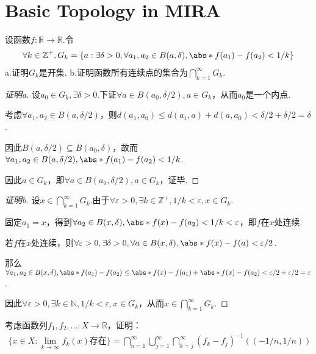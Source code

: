 \section{Basic Topology in MIRA}

\begin{problem}[2.B.12]\label{1.C.1}
    设函数\(f: \mathbb{R} \to \mathbb{R}\).令
    \begin{align*}
        \forall k \in \mathbb{Z}^+, G_k=\{a: \exists \delta>0, \forall a_1,a_2 \in B(a,\delta), \abs*{f(a_1)-f(a_2)}<1/k\}
    \end{align*}
    a.证明\(G_k\)是开集. \quad b.证明函数所有连续点的集合为\(\bigcap_{k=1}^\infty G_k\).
\end{problem}

\begin{proof}[证明a]
    设\(a_0 \in G_k, \exists \delta>0\).下证\(\forall a \in B(a_0,\delta/2), a \in G_k\)，从而\(a_0\)是一个内点.

    考虑\(\forall a_1,a_2 \in B(a,\delta/2)\)，则\(d(a_1,a_0) \leq d(a_1,a)+d(a,a_0)<\delta/2+\delta/2=\delta\).

    因此\(B(a,\delta/2) \subseteq B(a_0,\delta)\)，故而\(\forall a_1,a_2 \in B(a,\delta/2), \abs*{f(a_1)-f(a_2)}<1/k\).

    因此\(a \in G_k\)，即\(\forall a \in B(a_0,\delta/2), a \in G_k\)，证毕.
\end{proof}

\begin{proof}[证明b]
    设\(x \in \bigcap_{k=1}^\infty G_k\).由于\(\forall \varepsilon>0, \exists k \in \mathbb{Z}^+, 1/k<\varepsilon, x \in G_k\).

    固定\(a_1=x\)，得到\(\forall a_2 \in B(x,\delta), \abs*{f(x)-f(a_2)}<1/k<\varepsilon\)，即\(f\)在\(x\)处连续.

    若\(f\)在\(x\)处连续，则\(\forall \varepsilon>0, \exists \delta>0, \forall a \in B(x,\delta), \abs*{f(x)-f(a)}<\varepsilon/2\).

    那么\(\forall a_1, a_2 \in B(x,\delta), \abs*{f(a_1)-f(a_2)} \leq \abs*{f(x)-f(a_1)}+\abs*{f(x)-f(a_2)}<\varepsilon/2+\varepsilon/2=\varepsilon\).

    因此\(\forall \varepsilon>0, \exists k \in \mathbb{N}, 1/k<\varepsilon, x \in G_k\)，从而\(x \in \bigcap_{k=1}^\infty G_k\).
\end{proof}

\begin{problem}[2.B.14]\label{1.C.2}
    考虑函数列\(f_1, f_2, \dots: X \to \mathbb{R}\)，证明：
    \begin{align*}
        \{x \in X: \lim_{k \to \infty} f_k(x)\text{存在}\}
        =\bigcap_{n=1}^\infty \bigcup_{j=1}^\infty \bigcap_{k=j}^\infty (f_k-f_j)^{-1}((-1/n, 1/n))
    \end{align*}
\end{problem}

